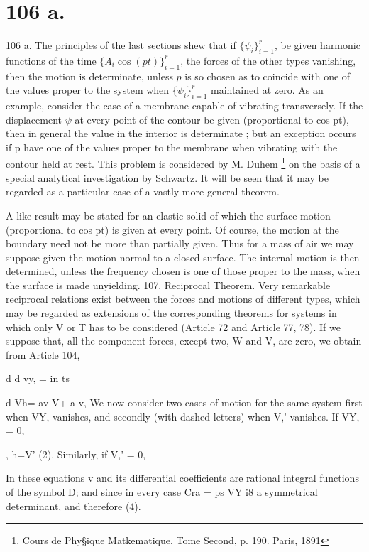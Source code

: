 \section{106 a.} 106 a.
The principles of the last sections shew that if
\(\{\psi_i\}_{i=1}^r\),
be given harmonic functions of the time
\(\{A_i \cos(pt) \}_{i=1}^r\),
the forces of the
other types vanishing, then the motion is determinate, unless \(p\) is so
chosen as to coincide with one of the values proper to the system when
\(\{\psi_i\}_{i=1}^r\) maintained at zero.
As an example, consider the case of a membrane
capable of vibrating transversely. If the displacement
\(\psi\)
at every
point of the contour be given (proportional to cos pt), then in general
the value in the interior is determinate ; but an exception occurs if p
have one of the values proper to the membrane when vibrating with the
contour held at rest. This problem is considered by M. Duhem
\footnote{Cours de Phy§ique Matkematique, Tome Second, p. 190. Paris, 1891}
on the basis of a special analytical investigation by Schwartz. It will be seen
that it may be regarded as a particular case of a vastly more general theorem.

A like result may be stated for an elastic solid of which the surface
motion (proportional to cos pt) is given at every point. Of course, the
motion at the boundary need not be more than partially given. Thus for a
mass of air we may suppose given the motion normal to a closed surface.
The internal motion is then determined, unless the frequency chosen
is one of those proper to the mass, when the surface is made unyielding.
107. Reciprocal Theorem.
Very remarkable reciprocal relations exist between the forces and motions
of different types, which may be regarded as extensions of the corresponding
theorems for systems in which only V or T has to be considered (Article 72 and
Article 77, 78). If we suppose that, all the component forces, except two, W
and V, are zero, we obtain from Article 104,

d d vy, = in ts

d Vh= av V+ a v, We now consider two cases of motion for the same system first
when VY, vanishes, and secondly (with dashed letters) when V,' vanishes. If VY,
= 0,

, h=V' (2). Similarly, if V,' = 0,

In these equations v and its differential coefficients are rational integral
functions of the symbol D; and since in every case Cra = ps VY i8 a symmetrical
determinant, and therefore (4).

